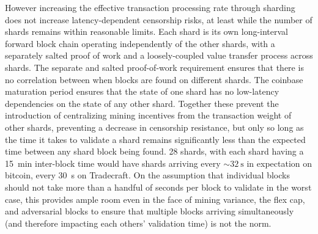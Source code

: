However increasing the effective transaction processing rate through
sharding does not increase latency-dependent censorship risks, at
least while the number of shards remains within reasonable limits.
Each shard is its own long-interval forward block chain operating
independently of the other shards, with a separately salted proof of
work and a loosely-coupled value transfer process across shards.  The
separate and salted proof-of-work requirement ensures that there is no
correlation between when blocks are found on different shards.  The
coinbase maturation period ensures that the state of one shard has no
low-latency dependencies on the state of any other shard.  Together
these prevent the introduction of centralizing mining incentives from
the transaction weight of other shards, preventing a decrease in
censorship resistance, but only so long as the time it takes to
validate a shard remains significantly less than the expected time
between any shard block being found.  \num{28} shards, with each shard
having a \SI{15}{\minute} inter-block time would have shards arriving
every $\sim\SI{32}{\second}$ in expectation on bitcoin, every
\SI{30}{\second} on Tradecraft.  On the assumption that individual blocks
should not take more than a handful of seconds per block to validate
in the worst case, this provides ample room even in the face of mining
variance, the flex cap, and adversarial blocks to ensure that multiple
blocks arriving simultaneously (and therefore impacting each others'
validation time) is not the norm.

